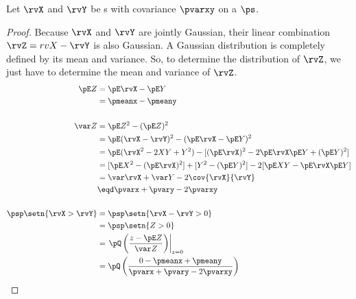 \begin{proposition}
Let $\rvX$ and $\rvY$ be s
with covariance $\pvarxy$ on a
 $\ps$.
\end{proposition}
\begin{proof}
Because $\rvX$ and $\rvY$ are jointly Gaussian,
their linear combination $\rvZ=rvX-\rvY$ is also Gaussian.
A Gaussian distribution is completely defined by its mean and variance.
So, to determine the distribution of $\rvZ$,
we just have to determine the mean and variance of $\rvZ$.
\begin{align*}
  \pE Z
    &= \pE\rvX - \pE Y
  \\&= \pmeanx - \pmeany
\\
\\
  \var Z
    &= \pE Z^2 - (\pE Z)^2
  \\&= \pE (\rvX-\rvY)^2 - (\pE\rvX - \pE Y)^2
  \\&= \pE (\rvX^2-2XY+Y^2) - [(\pE\rvX)^2 -2\pE\rvX \pE Y + (\pE Y)^2 ]
  \\&= [\pE X^2- (\pE\rvX)^2]  + [Y^2- (\pE Y)^2] - 2[\pE XY - \pE\rvX \pE Y]
  \\&= \var\rvX + \var Y - 2\cov{\rvX}{\rvY}
  \\&\eqd \pvarx + \pvary -2\pvarxy
\\
\\
  \psp\setn{\rvX>\rvY}
    &= \psp\setn{\rvX-\rvY>0}
  \\&= \psp\setn{Z>0}
  \\&= \left.\pQ\left(\frac{z-\pE Z}{\var Z} \right)\right|_{z=0}
  \\&= \pQ\left(\frac{0-\pmeanx+\pmeany}{\pvarx+\pvary-2\pvarxy} \right)
\end{align*}
\end{proof}

